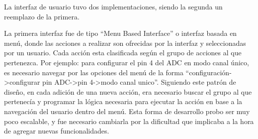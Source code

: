 
La interfaz de usuario tuvo dos implementaciones, siendo la segunda un reemplazo de la primera.

La primera interfaz fue de tipo ``Menu Based Interface'' o interfaz basada en menú, donde las acciones a realizar son ofrecidas por la interfaz y seleccionadas por un usuario. Cada acción esta clasificada según el grupo de acciones al que pertenezca. Por ejemplo: para configurar el pin 4 del ADC en modo canal único, es necesario navegar por las opciones del menú de la forma ``configuración->configurar pin ADC->pin 4->modo canal unico''. Siguiendo este patrón de diseño, en cada adición de una nueva acción, era necesario buscar el grupo al que pertenecía y programar la lógica necesaria para ejecutar la acción en base a la navegación del usuario dentro del menú. Esta forma de desarrollo probo ser muy poco escalable, y fue necesario cambiarla por la dificultad que implicaba a la hora de agregar nuevas funcionalidades. \\

